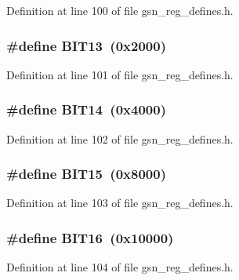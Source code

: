 Definition at line 100 of file gsn\_\-reg\_\-defines.h.

\hypertarget{a00546_a965dc1748ab1cf91426bd04a2fe16ecf}{
\subsubsection[{BIT13}]{\setlength{\rightskip}{0pt plus 5cm}\#define BIT13~(0x2000)}}
\label{a00546_a965dc1748ab1cf91426bd04a2fe16ecf}


Definition at line 101 of file gsn\_\-reg\_\-defines.h.

\hypertarget{a00546_a41e750b67eb36c8da10328c565b90dd5}{
\subsubsection[{BIT14}]{\setlength{\rightskip}{0pt plus 5cm}\#define BIT14~(0x4000)}}
\label{a00546_a41e750b67eb36c8da10328c565b90dd5}


Definition at line 102 of file gsn\_\-reg\_\-defines.h.

\hypertarget{a00546_ae40f5db1c57c98c6db42f15e0a56f03a}{
\subsubsection[{BIT15}]{\setlength{\rightskip}{0pt plus 5cm}\#define BIT15~(0x8000)}}
\label{a00546_ae40f5db1c57c98c6db42f15e0a56f03a}


Definition at line 103 of file gsn\_\-reg\_\-defines.h.

\hypertarget{a00546_a7c55b9d74a6a1b129397792053cf08d5}{
\subsubsection[{BIT16}]{\setlength{\rightskip}{0pt plus 5cm}\#define BIT16~(0x10000)}}
\label{a00546_a7c55b9d74a6a1b129397792053cf08d5}


Definition at line 104 of file gsn\_\-reg\_\-defines.h.

